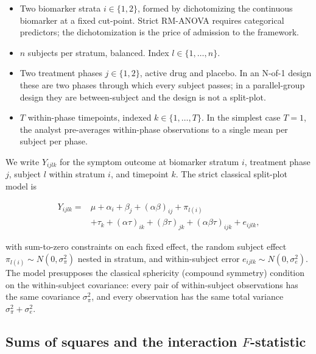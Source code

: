 \documentclass[
  11pt,
]{article}
\providecommand{\tightlist}{%
  \setlength{\itemsep}{0pt}\setlength{\parskip}{0pt}}
\begin{document}
\begin{itemize}
\tightlist
\item
  Two biomarker strata \(i \in \{1, 2\}\), formed by dichotomizing
  the continuous biomarker at a fixed cut-point. Strict
  RM-ANOVA requires categorical predictors; the
  dichotomization is the price of admission to the framework.
\item
  \(n\) subjects per stratum, balanced. Index
  \(l \in \{1, \ldots, n\}\).
\item
  Two treatment phases \(j \in \{1, 2\}\), active drug and placebo.
  In an N-of-1 design these are two phases through which every
  subject passes; in a parallel-group design they are
  between-subject and the design is not a split-plot.
\item
  \(T\) within-phase timepoints, indexed
  \(k \in \{1, \ldots, T\}\). In the simplest case \(T = 1\), the
  analyst pre-averages within-phase observations to a single
  mean per subject per phase.
\end{itemize}

We write \(Y_{ijlk}\) for the symptom outcome at biomarker stratum
\(i\), treatment phase \(j\), subject \(l\) within stratum \(i\), and
timepoint \(k\). The strict classical split-plot model is

\begin{equation}
\begin{split}
Y_{ijlk} = {} & \mu + \alpha_i + \beta_j + (\alpha\beta)_{ij}
+ \pi_{l(i)} \\
& + \tau_k + (\alpha\tau)_{ik} + (\beta\tau)_{jk}
+ (\alpha\beta\tau)_{ijk} + e_{ijlk},
\end{split}
\label{eq:rmanova-model}
\end{equation}

with sum-to-zero constraints on each fixed effect, the random
subject effect \(\pi_{l(i)} \sim N(0, \sigma_\pi^2)\) nested in
stratum, and within-subject error \(e_{ijlk} \sim N(0,
\sigma_e^2)\). The model presupposes the classical sphericity
(compound symmetry) condition on the within-subject covariance:
every pair of within-subject observations has the same covariance
\(\sigma_\pi^2\), and every observation has the same total variance
\(\sigma_\pi^2 + \sigma_e^2\).

\subsection{\texorpdfstring{Sums of squares and the interaction \(F\)-statistic}{Sums of squares and the interaction F-statistic}}\label{sums-of-squares-and-the-interaction-f-statistic}
\end{document}
